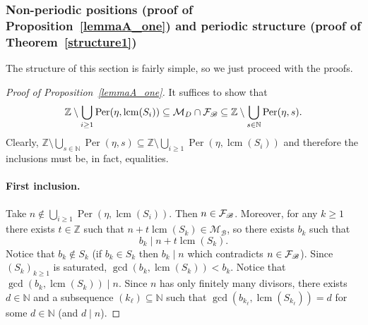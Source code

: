 \documentclass[leqno,a4paper,12pt]{article}
\DeclareMathOperator{\lcm}{lcm}
\theoremstyle{definition}
\newcommand{\divides}{\mid}
\newcommand{\Per}{\operatorname{Per}\nolimits}
\newcommand{\cf}{{\cal F}}
\newcommand{\Z}{{\mathbb{Z}}}
\newcommand{\N}{{\mathbb{N}}}
\newcommand{\sB}{\mathscr{B}}
\begin{document}
\subsubsection{Non-periodic positions (proof of Proposition~\ref{lemmaA_one}) and periodic structure (proof of Theorem~\ref{structure1})}
The structure of this section is fairly simple, so we just proceed with the proofs.
\begin{proof}[Proof of Proposition~\ref{lemmaA_one}]
It suffices to show that
\begin{equation}\label{dwie_inkluzje}
\Z\setminus \bigcup_{i\geq 1}\Per(\eta,\lcm(S_i)) \subseteq \mathcal{M}_D\cap\cf_\sB \subseteq \Z\setminus \bigcup_{s\in\N}\Per(\eta,s).
\end{equation}
Clearly, $\Z\setminus \bigcup_{s\in\N}\Per(\eta,s)\subseteq \Z\setminus \bigcup_{i\geq 1}\Per(\eta,\lcm(S_i))$ and therefore the inclusions must be, in fact, equalities.

\paragraph{First inclusion.} Take $n\not\in\bigcup_{i\geq 1}\Per(\eta,\lcm(S_i))$. Then $n\in\cf_\sB$. Moreover, for any $k\geq 1$ there exists $t\in \Z$ such that $n+t\lcm(S_k) \in\mathcal{M}_\mathscr{B}$, so there exists $b_k$ such that
\[
b_k\mid n+t\lcm(S_k).
\]
Notice that $b_k\notin S_k$ (if $b_k\in S_k$ then $b_k\mid n$ which contradicts $n\in\cf_\sB$). Since $(S_k)_{k\geq1}$ is saturated, $\gcd(b_k,\lcm(S_k))<b_k$. Notice that $\gcd(b_k,\lcm(S_k))\mid n$. Since $n$ has only finitely many divisors, there exists $d\in\N$ and a subsequence $(k_\ell)\subseteq\N$ such that $\gcd(b_{k_\ell},\lcm(S_{k_\ell}))=d$ for some $d\in\N$ (and $d\divides n$).


\end{proof}
\end{document}
